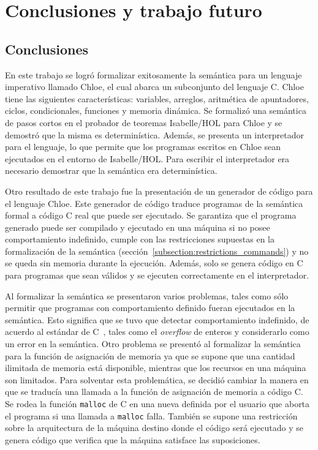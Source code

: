 \chapter{Conclusiones y trabajo futuro}\label{chapter:conclusion}

\section{Conclusiones}

En este trabajo se logró formalizar exitosamente la semántica para un lenguaje imperativo llamado Chloe, el cual abarca un subconjunto del lenguaje C.
Chloe tiene las siguientes características: variables, arreglos, aritmética de apuntadores, ciclos, condicionales, funciones y memoria dinámica.
Se formalizó una semántica de pasos cortos en el probador de teoremas Isabelle/HOL para Chloe y se demostró que la misma es determinística.
Además, se presenta un interpretador para el lenguaje, lo que permite que los programas escritos en Chloe sean ejecutados en el entorno de Isabelle/HOL.
Para escribir el interpretador era necesario demostrar que la semántica era determinística.

Otro resultado de este trabajo fue la presentación de un generador de código para el lenguaje Chloe.
Este generador de código traduce programas de la semántica formal a código C real que puede ser ejecutado.
Se garantiza que el programa generado puede ser compilado y ejecutado en una máquina si no posee comportamiento indefinido, cumple con las restricciones supuestas en la formalización de la semántica (sección~\ref{subsection:restrictions_commands}) y no se queda sin memoria durante la ejecución.
Además, solo se genera código en C para programas que sean válidos y se ejecuten correctamente en el interpretador.

Al formalizar la semántica se presentaron varios problemas, tales como sólo permitir que programas con comportamiento definido fueran ejecutados en la semántica.
Esto significa que se tuvo que detectar comportamiento indefinido, de acuerdo al estándar de C~\citep{c99}, tales como el \textit{overflow} de enteros y considerarlo como un error en la semántica.
Otro problema se presentó al formalizar la semántica para la función de asignación de memoria ya que se supone que una cantidad ilimitada de memoria está disponible, mientras que los recursos en una máquina son limitados.
Para solventar esta problemática, se decidió cambiar la manera en que se traducía una llamada a la función de asignación de memoria a código C.
Se rodea la función \verb|malloc| de C en una nueva definida por el usuario que aborta el programa si una llamada a \verb|malloc| falla.
También se supone una restricción sobre la arquitectura de la máquina destino donde el código será ejecutado y se genera código que verifica que la máquina satisface las suposiciones.


